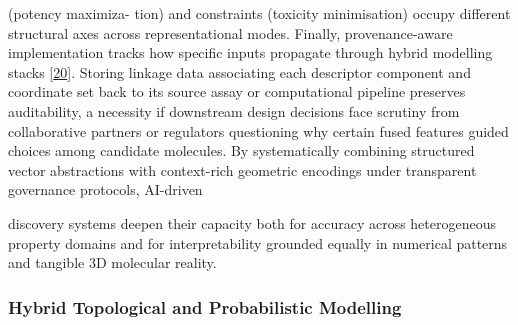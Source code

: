 \documentclass[
]{article}
\begin{document}
(potency maximiza- tion) and constraints (toxicity minimisation) occupy
different structural axes across representational modes. Finally,
provenance-aware implementation tracks how specific inputs propagate
through hybrid modelling stacks
{[}\protect\hyperlink{_bookmark60}{20}{]}. Storing linkage data
associating each descriptor component and coordinate set back to its
source assay or computational pipeline preserves auditability, a
necessity if downstream design decisions face scrutiny from
collaborative partners or regulators questioning why certain fused
features guided choices among candidate molecules. By systematically
combining structured vector abstractions with context-rich geometric
encodings under transparent governance protocols, AI-driven

discovery systems deepen their capacity both for accuracy across
heterogeneous property domains and for interpretability grounded equally
in numerical patterns and tangible 3D molecular reality.

\hypertarget{hybrid-topological-and-probabilistic-modelling}{%
\subsubsection{Hybrid Topological and Probabilistic
Modelling}\label{hybrid-topological-and-probabilistic-modelling}}
\end{document}
